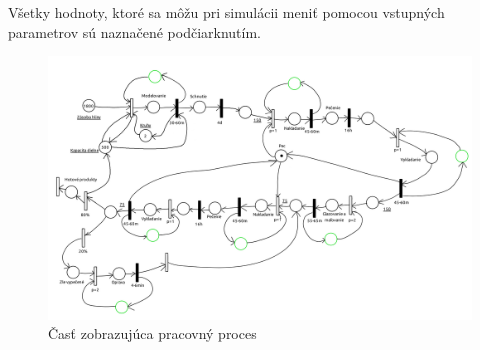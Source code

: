 \documentclass[11pt,a4paper]{article}
\begin{document}
Všetky hodnoty, ktoré sa môžu pri simulácii meniť pomocou vstupných parametrov sú naznačené podčiarknutím.
\begin{landscape}
\begin{figure}
    \centering
    \includegraphics[scale=0.8]{ims_pracovny_cyklus.png}
    \caption{Časť zobrazujúca pracovný proces}
    \label{fig:petri_net_work_process}
\end{figure}
\end{landscape}
\end{document}

